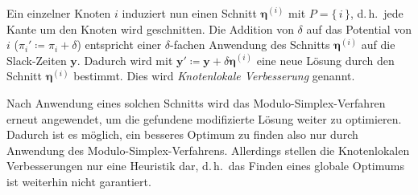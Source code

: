 \documentclass[a4paper, 10pt, twocolumn]{scrartcl}
\renewcommand{\vec}[1]{\boldsymbol{#1}}
\renewcommand{\dh}{d.\,h.~}
\begin{document}
		Ein einzelner Knoten \(i\) induziert nun einen Schnitt \( \vec{\eta}^{(i)} \) mit \( P = \{\, i \,\} \), \dh jede Kante um den Knoten wird geschnitten. Die Addition von \( \delta \) auf das Potential von \(i\) (\( \pi_i' \coloneqq \pi_i + \delta \)) entspricht einer \(\delta\)-fachen Anwendung des Schnitts \( \vec{\eta}^{(i)} \) auf die Slack-Zeiten \( \vec{y} \). Dadurch wird mit \( \vec{y}' \coloneqq \vec{y} + \delta\vec{\eta}^{(i)} \) eine neue Lösung durch den Schnitt \( \vec{\eta}^{(i)} \) bestimmt. Dies wird \emph{Knotenlokale Verbesserung} genannt.
		
		Nach Anwendung eines solchen Schnitts wird das Modulo-Simplex-Verfahren erneut angewendet, um die gefundene modifizierte Lösung weiter zu optimieren. Dadurch ist es möglich, ein besseres Optimum zu finden also nur durch Anwendung des Modulo-Simplex-Verfahrens. Allerdings stellen die Knotenlokalen Verbesserungen nur eine Heuristik dar, \dh das Finden eines globale Optimums ist weiterhin nicht garantiert.
\end{document}
